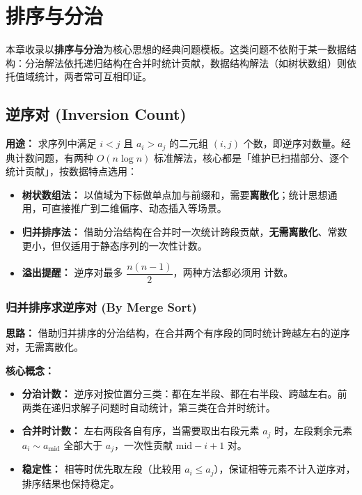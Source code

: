 \section{排序与分治}

本章收录以\textbf{排序与分治}为核心思想的经典问题模板。这类问题不依附于某一数据结构：分治解法依托递归结构在合并时统计贡献，数据结构解法（如树状数组）则依托值域统计，两者常可互相印证。

\subsection{逆序对 (Inversion Count)}

\textbf{用途：}
求序列中满足 $i < j$ 且 $a_i > a_j$ 的二元组 $(i, j)$ 个数，即逆序对数量。经典计数问题，有两种 $O(n \log n)$ 标准解法，核心都是「维护已扫描部分、逐个统计贡献」，按数据特点选用：

\begin{itemize}
  \item \textbf{树状数组法：} 以值域为下标做单点加与前缀和，需要\textbf{离散化}；统计思想通用，可直接推广到二维偏序、动态插入等场景。
  \item \textbf{归并排序法：} 借助分治结构在合并时一次统计跨段贡献，\textbf{无需离散化}、常数更小，但仅适用于静态序列的一次性计数。
  \item \textbf{溢出提醒：} 逆序对最多 $\dfrac{n(n-1)}{2}$，两种方法都必须用  计数。
\end{itemize}

\subsubsection{归并排序求逆序对 (By Merge Sort)}

\textbf{思路：}
借助归并排序的分治结构，在合并两个有序段的同时统计跨越左右的逆序对，无需离散化。

\textbf{核心概念：}
\begin{itemize}
  \item \textbf{分治计数：} 逆序对按位置分三类：都在左半段、都在右半段、跨越左右。前两类在递归求解子问题时自动统计，第三类在合并时统计。
  \item \textbf{合并时计数：} 左右两段各自有序，当需要取出右段元素 $a_j$ 时，左段剩余元素 $a_i \sim a_{\text{mid}}$ 全部大于 $a_j$，一次性贡献 $\text{mid} - i + 1$ 对。
  \item \textbf{稳定性：} 相等时优先取左段（比较用 $a_i \le a_j$），保证相等元素不计入逆序对，排序结果也保持稳定。
\end{itemize}

